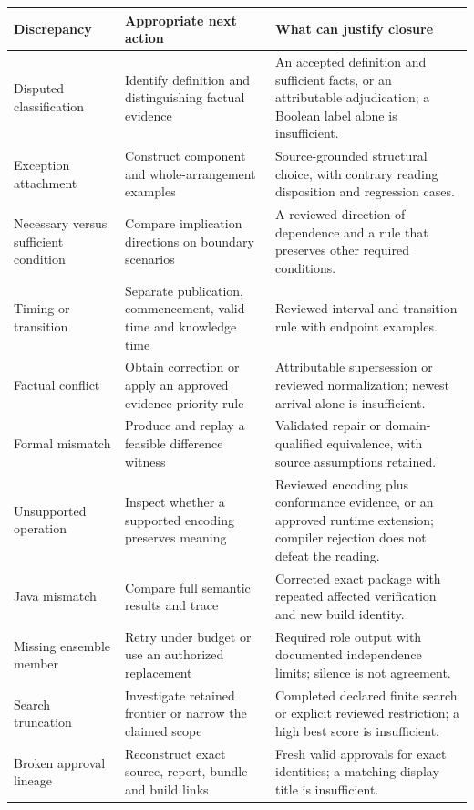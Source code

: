 \documentclass[12pt,a4paper,oneside,openany]{book}
\begin{document}
\endgroup
\begin{longtable}{@{}P{27mm}P{56mm}P{65mm}@{}}

\toprule Discrepancy & Appropriate next action & What can justify closure\\\midrule\endhead
Disputed classification & Identify definition and distinguishing factual evidence & An accepted definition and sufficient facts, or an attributable adjudication; a Boolean label alone is insufficient.\\
Exception attachment & Construct component and whole-arrangement examples & Source-grounded structural choice, with contrary reading disposition and regression cases.\\
Necessary versus sufficient condition & Compare implication directions on boundary scenarios & A reviewed direction of dependence and a rule that preserves other required conditions.\\
Timing or transition & Separate publication, commencement, valid time and knowledge time & Reviewed interval and transition rule with endpoint examples.\\
Factual conflict & Obtain correction or apply an approved evidence-priority rule & Attributable supersession or reviewed normalization; newest arrival alone is insufficient.\\
Formal mismatch & Produce and replay a feasible difference witness & Validated repair or domain-qualified equivalence, with source assumptions retained.\\
Unsupported operation & Inspect whether a supported encoding preserves meaning & Reviewed encoding plus conformance evidence, or an approved runtime extension; compiler rejection does not defeat the reading.\\
Java mismatch & Compare full semantic results and trace & Corrected exact package with repeated affected verification and new build identity.\\
Missing ensemble member & Retry under budget or use an authorized replacement & Required role output with documented independence limits; silence is not agreement.\\
Search truncation & Investigate retained frontier or narrow the claimed scope & Completed declared finite search or explicit reviewed restriction; a high best score is insufficient.\\
Broken approval lineage & Reconstruct exact source, report, bundle and build links & Fresh valid approvals for exact identities; a matching display title is insufficient.\\
\bottomrule
\end{longtable}
\end{document}
